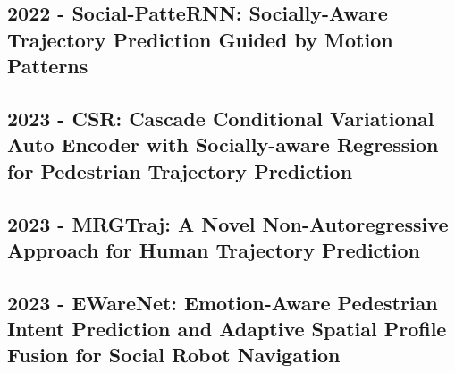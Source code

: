 \subsection*{2022 - Social-PatteRNN: Socially-Aware Trajectory Prediction Guided by Motion Patterns}

\cite{navarro2022social}

\subsection*{2023 - CSR: Cascade Conditional Variational Auto Encoder with Socially-aware Regression for Pedestrian Trajectory Prediction}

\cite{zhou2023csr}

\subsection*{2023 - MRGTraj: A Novel Non-Autoregressive Approach for Human Trajectory Prediction}

\cite{peng2023mrgtraj}

\subsection*{2023 - EWareNet: Emotion-Aware Pedestrian Intent Prediction and Adaptive Spatial Profile Fusion for Social Robot Navigation}

\cite{narayanan2023ewarenet}
